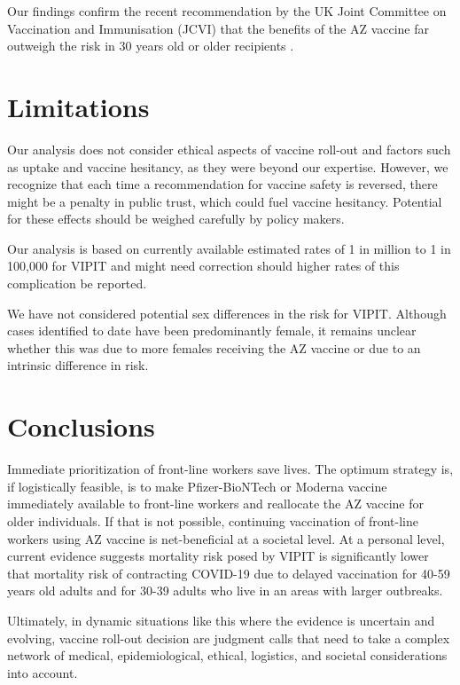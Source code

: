 \documentclass[]{interact}
\theoremstyle{plain}%
\theoremstyle{definition}
\theoremstyle{remark}
\begin{document}
Our findings confirm the recent recommendation by the UK Joint Committee
on Vaccination and Immunisation (JCVI) that the benefits of the AZ
vaccine far outweigh the risk in 30 years old or older recipients
\citep{jcvi_jcvi_2021}.

\hypertarget{limitations}{%
\section{Limitations}\label{limitations}}

Our analysis does not consider ethical aspects of vaccine roll-out and
factors such as uptake and vaccine hesitancy, as they were beyond our
expertise. However, we recognize that each time a recommendation for
vaccine safety is reversed, there might be a penalty in public trust,
which could fuel vaccine hesitancy. Potential for these effects should
be weighed carefully by policy makers.

Our analysis is based on currently available estimated rates of 1 in
million to 1 in 100,000 for VIPIT and might need correction should
higher rates of this complication be reported.

We have not considered potential sex differences in the risk for VIPIT.
Although cases identified to date have been predominantly female, it
remains unclear whether this was due to more females receiving the AZ
vaccine or due to an intrinsic difference in risk.

\hypertarget{conclusions}{%
\section{Conclusions}\label{conclusions}}

Immediate prioritization of front-line workers save lives. The optimum
strategy is, if logistically feasible, is to make Pfizer-BioNTech or
Moderna vaccine immediately available to front-line workers and
reallocate the AZ vaccine for older individuals. If that is not
possible, continuing vaccination of front-line workers using AZ vaccine
is net-beneficial at a societal level. At a personal level, current
evidence suggests mortality risk posed by VIPIT is significantly lower
that mortality risk of contracting COVID-19 due to delayed vaccination
for 40-59 years old adults and for 30-39 adults who live in an areas
with larger outbreaks.

Ultimately, in dynamic situations like this where the evidence is
uncertain and evolving, vaccine roll-out decision are judgment calls
that need to take a complex network of medical, epidemiological,
ethical, logistics, and societal considerations into account.



\end{document}
